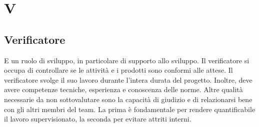 \section*{V}
\markright{}
\subsection*{Verificatore}
E un ruolo di sviluppo, in particolare di supporto allo sviluppo. Il verificatore si occupa di controllare se le attività e i prodotti sono conformi alle attese. Il verificatore svolge il suo lavoro durante l'intera durata del progetto. Inoltre, deve avere competenze tecniche, esperienza e conoscenza delle norme. Altre qualità necessarie da non sottovalutare sono la capacità di giudizio e di relazionarsi bene con gli altri membri del team. La prima è fondamentale per rendere quantificabile il lavoro supervisionato, la seconda per evitare attriti interni.
